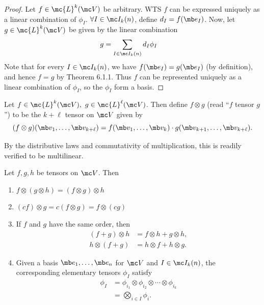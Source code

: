 \documentclass{fkbook}
\theoremstyle{snazzydefinition}
\begin{document}
\begin{proof}
  Let $f \in \mc{L}^k(\mc V)$ be arbitrary. WTS $f$ can be expressed
  uniquely as a linear combination of $\phi_I$. $\forall I \in \mc
  I_k(n)$, define $d_I = f(\mb e_I)$. Now, let $g \in \mc{L}^k(\mc V)$
  be given by the linear combination
  \begin{align*}
    g
    &= \sum_{I \in \mc I_k(n)} d_I \phi_I
  \end{align*}
  Note that for every $I \in \mc I_k(n)$, we have $f(\mb e_I) = g(\mb
  e_I)$ (by definition), and hence $f = g$ by Theorem 6.1.1. Thus $f$
  can be represented uniquely as a linear combination of $\phi_I$, so
  the $\phi_I$ form a basis.
\end{proof}
\begin{definition}
  Let $f \in \mc{L}^k(\mc V),\ g \in \mc{L}^\ell(\mc V)$. Then define
  $f \otimes g$ (read ``$f$ tensor $g$'') to be the $k+\ell$ tensor on
  $\mc V$ given by
  \[
    (f \otimes g)(\mb v_1, \ldots, \mb v_{k + \ell}) = f(\mb v_1,
    \ldots, \mb v_k) \cdot g(\mb v_{k+1}, \ldots, \mb v_{k+\ell}).
  \]
\end{definition}
By the distributive laws and commutativity of multiplication, this is
readily verified to be multilinear.
\begin{theorem}
  Let $f,g,h$ be tensors on $\mc V$. Then
  \begin{enumerate}[label=(\arabic*)]
    \item $f \otimes (g \otimes h) = (f \otimes g) \otimes h$
    \item $(cf) \otimes g = c(f \otimes g) = f \otimes (cg)$
    \item If $f$ and $g$ have the same order, then
      \begin{align*}
        (f+g) \otimes h
        &= f \otimes h + g \otimes h, \\
        h \otimes (f+g)
        &= h \otimes f + h \otimes g.
      \end{align*}
    \item Given a basis $\mb e_1, \ldots, \mb e_n$ for $\mc V$ and $I
      \in \mc I_k(n)$, the corresponding elementary tensors $\phi_I$
      satisfy
      \begin{align*}
        \phi_I
        &= \phi_{i_1} \otimes \phi_{i_2} \otimes \cdots \otimes
          \phi_{i_k} \\
        &= \bigotimes_{i \in I} \phi_i.
      \end{align*}
  \end{enumerate}
\end{theorem}
\end{document}
